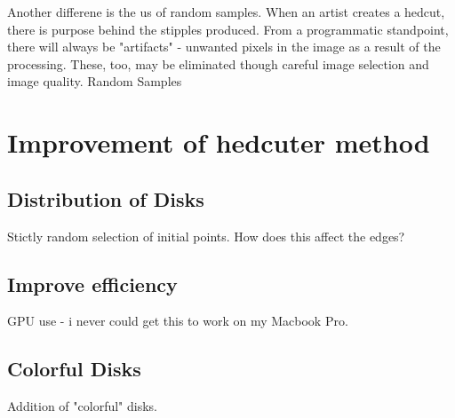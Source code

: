 \documentclass[11pt]{article}
\begin{document}
Another differene is the us of random samples. When an artist creates a hedcut, there is purpose behind the stipples produced. From a programmatic standpoint, there will always be "artifacts" - unwanted pixels in the image as a result of the processing. These, too, may be eliminated though careful image selection and image quality.
Random Samples

\section{Improvement of hedcuter method}

\subsection{Distribution of Disks}
Stictly random selection of initial points. How does this affect the edges?

\subsection{Improve efficiency}
GPU use - i never could get this to work on my Macbook Pro.


\subsection{Colorful Disks}
Addition of "colorful" disks.
\end{document}
